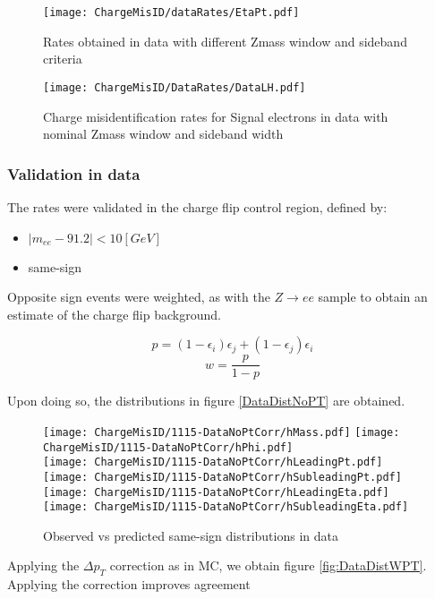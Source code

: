 \begin{figure}[h]
\ContinuedFloat
\centering
\texttt{[image: ChargeMisID/dataRates/EtaPt.pdf]}
\caption{Rates obtained in data with different Zmass window and sideband criteria}
\label{fig:DataRates}
\end{figure}

\begin{figure}[h]
\centering
\texttt{[image: ChargeMisID/DataRates/DataLH.pdf]}{}
\caption{Charge misidentification rates for Signal electrons in data with nominal Zmass window and sideband width}
\label{fig:DataRates2D}
\end{figure}

\FloatBarrier
\subsubsection*{Validation in data}
The rates were validated in the charge flip control region, defined by:

\begin{itemize}
\item $|m_{ee} - 91.2| < 10 [GeV]$
\item same-sign
\end{itemize}

Opposite sign events were weighted, as with the $Z\rightarrow ee$ sample to obtain an estimate of the charge flip background. 

$$p =(1-\epsilon_i)\epsilon_j + (1-\epsilon_j)\epsilon_i$$
$$w = \frac{p}{1-p}$$

Upon doing so, the distributions in figure \ref{DataDistNoPT} are obtained.

\begin{figure}[h]
\centering
\texttt{[image: ChargeMisID/1115-DataNoPtCorr/hMass.pdf]}
\texttt{[image: ChargeMisID/1115-DataNoPtCorr/hPhi.pdf]}\\
\texttt{[image: ChargeMisID/1115-DataNoPtCorr/hLeadingPt.pdf]}
\texttt{[image: ChargeMisID/1115-DataNoPtCorr/hSubleadingPt.pdf]}\\
\texttt{[image: ChargeMisID/1115-DataNoPtCorr/hLeadingEta.pdf]}
\texttt{[image: ChargeMisID/1115-DataNoPtCorr/hSubleadingEta.pdf]}
\caption{Observed vs predicted same-sign distributions in data}
\label{fig:DataDistNoPT}
\end{figure}

Applying the $\Delta p_T$ correction as in MC, we obtain figure \ref{fig:DataDistWPT}. Applying the \pT correction improves agreement

